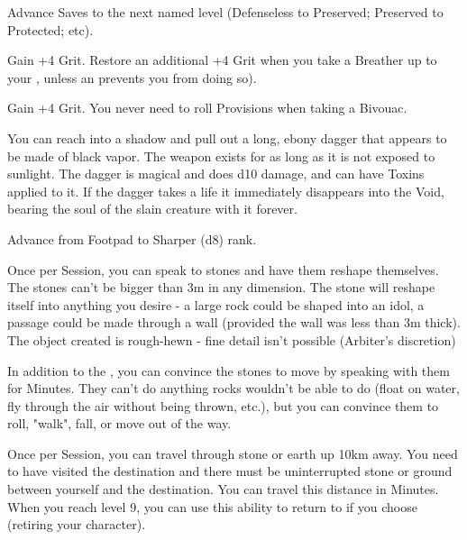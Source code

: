 \begin{multicols*}{2}
Advance  Saves to the next named level (Defenseless to Preserved; Preserved to Protected; etc).


Gain +4 \MAX Grit. Restore an additional +4 Grit when you take a Breather up to your \MAX, unless an \INJURY prevents you from doing so).



Gain +4 \MAX Grit. You never need to roll Provisions when taking a Bivouac.


You can reach into a shadow and pull out a long, ebony dagger that appears to be made of black vapor. The weapon exists for as long as it is not exposed to sunlight.  The dagger is magical and does d10 damage, and can have Toxins applied to it.  If the dagger takes a life it immediately disappears into the Void, bearing the soul of the slain creature with it forever.


Advance  from Footpad to Sharper (d8) rank.



Once per Session, you can speak to stones and have them reshape themselves.  The stones can't be bigger than 3m in any dimension.  The stone will reshape itself into anything you desire - a large rock could be shaped into an idol, a passage could be made through a wall (provided the wall was less than 3m thick).  The object created is rough-hewn - fine detail isn't possible (Arbiter's discretion)



In addition to the , you can convince the stones to move by speaking with them for Minutes. They can't do anything rocks wouldn't be able to do (float on water, fly through the air without being thrown, etc.), but you can convince them to roll, "walk", fall, or move out of the way.


Once per Session, you can travel through stone or earth up 10km away. You need to have visited the destination and there must be uninterrupted stone or ground between yourself and the destination. You can travel this distance in Minutes. When you reach level 9, you can use this ability to return to  if you choose (retiring your character).


\end{multicols*}
